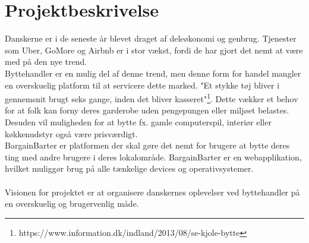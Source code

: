 \chapter{Projektbeskrivelse}\label{ch:Projektbeskrivelse}
Danskerne er i de seneste år blevet draget af deleøkonomi og genbrug. Tjenester som Uber, GoMore og Airbnb er i stor vækst, fordi de har gjort det nemt at være med på den nye trend. \\Byttehandler er en mulig del af denne trend, men denne form for handel mangler en overskuelig platform til at servicere dette marked. "Et stykke tøj bliver i gennemsnit brugt seks gange, inden det bliver kasseret"\footnote{https://www.information.dk/indland/2013/08/se-kjole-bytte}. Dette vækker et behov for at folk kan forny deres garderobe uden pengepungen eller miljøet belastes. Desuden vil muligheden for at bytte fx. gamle computerspil, interiør eller køkkenudstyr også være prisværdigt. \\
BargainBarter er platformen der skal gøre det nemt for brugere at bytte deres ting med andre brugere i deres lokalområde. BargainBarter er en webapplikation, hvilket muliggør brug på alle tænkelige devices og operativsystemer. \\ \\
Visionen for projektet er at organisere danskernes oplevelser ved byttehandler på en overskuelig og brugervenlig måde. 




